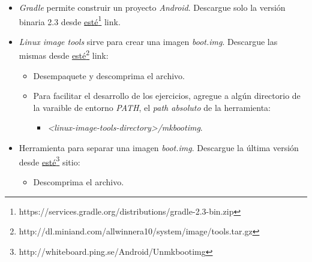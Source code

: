 \begin{itemize}
\begin{itemize}
      \item Para facilitar el desarrollo de los ejercicios, agregue las siguientes herramientas a la varaible de entorno \textit{PATH}:
      \begin{itemize}
  \item \textit{<android-sdk-directory>/platform-tools/adb}.
  \item \textit{<android-sdk-directory>/platform-tools/fastboot}.
  \item \textit{<android-sdk-directory>/platform-tools/sqlite3}.
  \item \textit{<android-sdk-directory>/tools/android}.
  \item \textit{<android-sdk-directory>/tools/emulator-x86}\footnote{Puede encontrarse con el nombre ``emulator''.}.
      \end{itemize}      
 \end{itemize}
 
 \item \textit{Gradle} permite construir un proyecto \emph{Android}. Descargue solo la versión binaria 2.3 desde \href{https://services.gradle.org/distributions/gradle-2.3-bin.zip}{esté}\footnote{https://services.gradle.org/distributions/gradle-2.3-bin.zip} link.

 \item \textit{Linux image tools} sirve para crear una imagen \textit{boot.img}. Descargue las mismas desde \href{http://dl.miniand.com/allwinnera10/system/image/tools.tar.gz}{esté}\footnote{http://dl.miniand.com/allwinnera10/system/image/tools.tar.gz} link:
 \begin{itemize}
      \item Desempaquete y descomprima el archivo.

      \item Para facilitar el desarrollo de los ejercicios, agregue a algún directorio de la varaible de entorno \textit{PATH}, el \textit{path absoluto} de la herramienta:
      \begin{itemize}
  \item \textit{<linux-image-tools-directory>/mkbootimg}.
      \end{itemize}
 \end{itemize}
 
 \item Herramienta para separar una imagen \textit{boot.img}. Descargue la última versión desde \href{http://whiteboard.ping.se/Android/Unmkbootimg}{esté}\footnote{http://whiteboard.ping.se/Android/Unmkbootimg} sitio:
 \begin{itemize}
      \item Descomprima el archivo.


\end{itemize}
\end{itemize}
